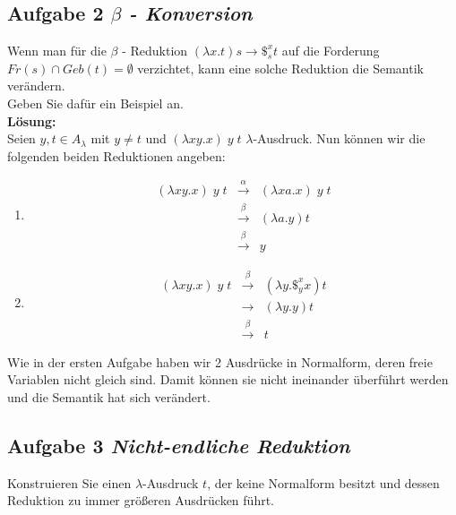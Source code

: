\documentclass[11pt,a4paper,ngerman]{article}
\begin{document}
\subsection*{Aufgabe 2 \mdseries\itshape $\beta$ - Konversion}
Wenn man für die $\beta$ - Reduktion $ (\lambda x.t)s \rightarrow \$_s^ x t$
auf die Forderung $Fr(s)\cap Geb(t) = \emptyset$ verzichtet, kann eine solche Reduktion die Semantik
verändern.\\
Geben Sie dafür ein Beispiel an.\\

\textbf{Lösung:}\\
   Seien $y,t \in A_\lambda$ mit $y \not= t$ und $(\lambda xy.x) \; y \; t$ $\lambda$-Ausdruck.
   Nun können wir die folgenden beiden Reduktionen angeben:
   \begin{enumerate}[1:]
      \item $$\begin{array}{rcl}
            (\lambda xy.x) \; y \; t &\overset{\alpha}{\longrightarrow}& (\lambda xa.x) \; y \; t\\
               &\overset{\beta}{\longrightarrow}& (\lambda a . y) t\\
               &\overset{\beta}{\longrightarrow}& y
         \end{array}$$
      \item $$\begin{array}{rcl}
            (\lambda xy.x) \; y \; t &\overset{\beta}{\longrightarrow}& 
               (\lambda y. \$_y^x x) t\\
               &\longrightarrow& (\lambda y.y) t\\
               &\overset{\beta}{\longrightarrow}& t
         \end{array}$$
   \end{enumerate}
   Wie in der ersten Aufgabe haben wir 2 Ausdrücke in Normalform, deren freie Variablen nicht gleich sind.
   Damit können sie nicht ineinander überführt werden und die Semantik hat sich verändert.

\subsection*{Aufgabe 3 \mdseries\itshape Nicht-endliche Reduktion}
Konstruieren Sie einen $\lambda$-Ausdruck $t$, der keine Normalform besitzt und dessen Reduktion
zu immer größeren Ausdrücken führt.\\
\end{document}
